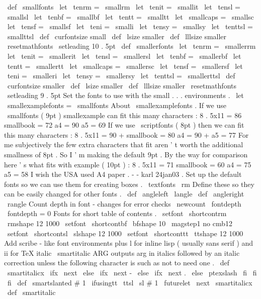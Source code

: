 \
def
\
smallfonts
{
%
\
let
\
tenrm
=
\
smallrm
\
let
\
tenit
=
\
smallit
\
let
\
tensl
=
\
smallsl
\
let
\
tenbf
=
\
smallbf
\
let
\
tentt
=
\
smalltt
\
let
\
smallcaps
=
\
smallsc
\
let
\
tensf
=
\
smallsf
\
let
\
teni
=
\
smalli
\
let
\
tensy
=
\
smallsy
\
let
\
tenttsl
=
\
smallttsl
\
def
\
curfontsize
{
small
}
%
\
def
\
lsize
{
smaller
}
\
def
\
lllsize
{
smaller
}
%
\
resetmathfonts
\
setleading
{
10
.
5pt
}
}
\
def
\
smallerfonts
{
%
\
let
\
tenrm
=
\
smallerrm
\
let
\
tenit
=
\
smallerit
\
let
\
tensl
=
\
smallersl
\
let
\
tenbf
=
\
smallerbf
\
let
\
tentt
=
\
smallertt
\
let
\
smallcaps
=
\
smallersc
\
let
\
tensf
=
\
smallersf
\
let
\
teni
=
\
smalleri
\
let
\
tensy
=
\
smallersy
\
let
\
tenttsl
=
\
smallerttsl
\
def
\
curfontsize
{
smaller
}
%
\
def
\
lsize
{
smaller
}
\
def
\
lllsize
{
smaller
}
%
\
resetmathfonts
\
setleading
{
9
.
5pt
}
}
%
Set
the
fonts
to
use
with
the
small
.
.
.
environments
.
\
let
\
smallexamplefonts
=
\
smallfonts
%
About
\
smallexamplefonts
.
If
we
use
\
smallfonts
(
9pt
)
smallexample
%
can
fit
this
many
characters
:
%
8
.
5x11
=
86
smallbook
=
72
a4
=
90
a5
=
69
%
If
we
use
\
scriptfonts
(
8pt
)
then
we
can
fit
this
many
characters
:
%
8
.
5x11
=
90
+
smallbook
=
80
a4
=
90
+
a5
=
77
%
For
me
subjectively
the
few
extra
characters
that
fit
aren
'
t
worth
%
the
additional
smallness
of
8pt
.
So
I
'
m
making
the
default
9pt
.
%
%
By
the
way
for
comparison
here
'
s
what
fits
with
example
(
10pt
)
:
%
8
.
5x11
=
71
smallbook
=
60
a4
=
75
a5
=
58
%
%
I
wish
the
USA
used
A4
paper
.
%
-
-
karl
24jan03
.
%
Set
up
the
default
fonts
so
we
can
use
them
for
creating
boxes
.
%
\
textfonts
\
rm
%
Define
these
so
they
can
be
easily
changed
for
other
fonts
.
\
def
\
angleleft
{
\
langle
}
\
def
\
angleright
{
\
rangle
}
%
Count
depth
in
font
-
changes
for
error
checks
\
newcount
\
fontdepth
\
fontdepth
=
0
%
Fonts
for
short
table
of
contents
.
\
setfont
\
shortcontrm
\
rmshape
{
12
}
{
1000
}
\
setfont
\
shortcontbf
\
bfshape
{
10
}
{
\
magstep1
}
%
no
cmb12
\
setfont
\
shortcontsl
\
slshape
{
12
}
{
1000
}
\
setfont
\
shortconttt
\
ttshape
{
12
}
{
1000
}
%
%
Add
scribe
-
like
font
environments
plus
l
for
inline
lisp
(
usually
sans
%
%
serif
)
and
ii
for
TeX
italic
%
\
smartitalic
{
ARG
}
outputs
arg
in
italics
followed
by
an
italic
correction
%
unless
the
following
character
is
such
as
not
to
need
one
.
\
def
\
smartitalicx
{
\
ifx
\
next
\
else
\
ifx
\
next
-
\
else
\
ifx
\
next
.
\
else
\
ptexslash
\
fi
\
fi
\
fi
}
\
def
\
smartslanted
#
1
{
{
\
ifusingtt
\
ttsl
\
sl
#
1
}
\
futurelet
\
next
\
smartitalicx
}
\
def
\
smartitalic
